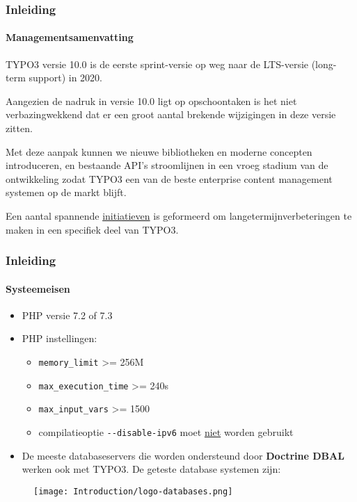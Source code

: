 \begin{frame}[fragile]
	\frametitle{Inleiding}
	\framesubtitle{Managementsamenvatting}

	\small
		TYPO3 versie 10.0 is de eerste sprint-versie op weg naar de LTS-versie
		(long-term support) in 2020.

		\vspace{0.2cm}

		Aangezien de nadruk in versie 10.0 ligt op opschoontaken is het niet verbazingwekkend
		dat er een groot aantal brekende wijzigingen in deze versie zitten.

		\vspace{0.2cm}

		Met deze aanpak kunnen we nieuwe bibliotheken en moderne concepten introduceren, en
		bestaande API's stroomlijnen in een vroeg stadium van de ontwikkeling zodat TYPO3
		een van de beste enterprise content management systemen op de markt blijft.

		\vspace{0.2cm}

		Een aantal spannende
		\href{https://typo3.org/community/teams/typo3-development/initiatives/}{initiatieven}
		is geformeerd om langetermijnverbeteringen te maken in een specifiek deel van TYPO3.
	\normalsize

\end{frame}


\begin{frame}[fragile]
	\frametitle{Inleiding}
	\framesubtitle{Systeemeisen}

	\begin{itemize}
		\item PHP versie 7.2 of 7.3
		\item PHP instellingen:

			\begin{itemize}
				\item \texttt{memory\_limit} >= 256M
				\item \texttt{max\_execution\_time} >= 240s
				\item \texttt{max\_input\_vars} >= 1500
				\item compilatieoptie \texttt{-}\texttt{-disable-ipv6} moet \underline{niet} worden gebruikt
			\end{itemize}

		\item De meeste databaseservers die worden ondersteund door \textbf{Doctrine DBAL} werken ook met TYPO3.
		De geteste database systemen zijn:
	\end{itemize}

	\begin{figure}
		\texttt{[image: Introduction/logo-databases.png]}
	\end{figure}

\end{frame}

